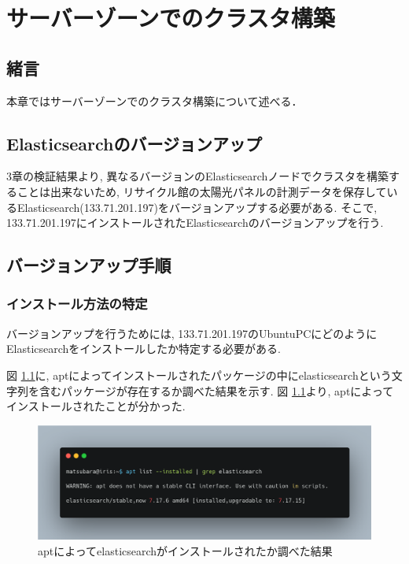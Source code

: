 \chapter{サーバーゾーンでのクラスタ構築}
\label{chap:fourth}

\section{緒言}
本章ではサーバーゾーンでのクラスタ構築について述べる．

\section{Elasticsearchのバージョンアップ}
3章の検証結果より, 異なるバージョンのElasticsearchノードでクラスタを構築することは出来ないため, リサイクル館の太陽光パネルの計測データを保存しているElasticsearch(133.71.201.197)をバージョンアップする必要がある. そこで, 133.71.201.197にインストールされたElasticsearchのバージョンアップを行う.

\section{バージョンアップ手順}

\subsection{インストール方法の特定}

バージョンアップを行うためには, 133.71.201.197のUbuntuPCにどのようにElasticsearchをインストールしたか特定する必要がある.

図 \ref{4-p1}に, aptによってインストールされたパッケージの中にelasticsearchという文字列を含むパッケージが存在するか調べた結果を示す.
図 \ref{4-p1}より, aptによってインストールされたことが分かった.

\begin{figure}
  \begin{center}
    \includegraphics[width=160mm]{sotu/figure/apt-grep.png}
    \caption{aptによってelasticsearchがインストールされたか調べた結果}
    \label{4-p1}
  \end{center}
\end{figure}

